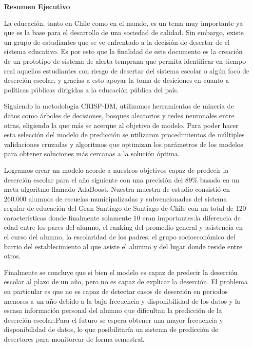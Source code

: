     \begin{center}
        \vspace*{1cm}
        
        \textbf{Resumen Ejecutivo}
        
        \vspace{0.5cm}
        
    \end{center}



La educación, tanto en Chile como en el mundo, es un tema muy importante ya que es la base para el desarrollo de una sociedad de calidad. Sin embargo, existe un grupo de estudiantes que se ve enfrentado a la decisión de desertar de el sistema educativo. Es por esto que la finalidad de este documento es la creación de un prototipo de sistema de alerta temprana que permita identificar en tiempo real aquellos estudiantes con riesgo de desertar del sistema escolar o algún foco de deserción escolar, y gracias a esto apoyar la toma de desiciones en cuanto a políticas públicas dirigidas a la educación pública del país.

Siguiendo la metodología CRISP-DM, utilizamos herramientas de minería de datos como árboles de decisiones, bosques aleatorios y redes neuronales entre otras, eligiendo la que más se acerque al objetivo de modelo. Para poder hacer esta selección del modelo de predicción se utilizaron procedimientos de múltiples validaciones cruzadas y algoritmos que optimizan los parámetros de los modelos para obtener soluciones más cercanas a la solución óptima.

Logramos crear un modelo acorde a nuestros objetivos capaz de predecir la deserción escolar para el año siguiente con una precisión del $89$\% basado en un meta-algoritmo llamado AdaBoost. Nuestra muestra de estudio consistió en $260.000$ alumnos de escuelas municipalizadas y subvencionadas del sistema regular de educación del Gran Santiago de Santiago de Chile con un total de $120$ características donde finalmente solamente $10$ eran importantes:la diferencia de edad entre los pares del alumno, el ranking del promedio general y asistencia en el curso del alumno, la escolaridad de los padres, el grupo socioeconómico del barrio del establecimiento al que asiste el alumno y del lugar donde reside entre otros. 

Finalmente se concluye que si bien el modelo es capaz de predecir la deserción escolar al plazo de un año, pero no es capaz de explicar la deserción. El problema en particular es que no es capaz de detectar casos de deserción en periodos menores a un año debido a la baja frecuencia y disponibilidad de los datos y la escasa información personal del alumno que dificultan la predicción de la deserción escolar.Para el futuro se espera obtener una mayor frecuencia y disponibilidad de datos, lo que posibilitaría un sistema de predicción de desertores para monitorear de forma semestral.
